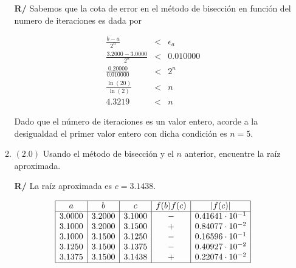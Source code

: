 \documentclass[12pt]{article}
\begin{document}
\begin{enumerate}[leftmargin=*,widest=9]
\begin{enumerate}[label=\alph*]
\textbf{R/} Sabemos que la cota de error en el método de bisección en función del numero de iteraciones es dada por 
   
   \begin{eqnarray*}
   \frac{b - a}{2^n} &<& \epsilon_a \\
   \frac{3.2000 - 3.0000}{2^n} &<& 0.010000 \\
   \frac{0.20000}{0.010000} &<& 2^n \\
   \frac{\ln(20)}{\ln(2)} &<& n \\
   4.3219 &<& n
   \end{eqnarray*}
   
   Dado que el número de iteraciones es un valor entero, acorde a la desigualdad el primer valor entero con dicha condición es \(n=5\).

   \item \((2.0)\) Usando el método de bisección y el \(n\) anterior, encuentre la raíz aproximada.

\textbf{R/} La raíz aproximada es \(c = 3.1438 \).
 
\begin{equation*}
     \begin{array}{|c|c|c|c|c|}
   \hline
   a & b & c & f(b)f(c) & |f(c)| \\
   \hline
   3.0000 & 3.2000 & 3.1000 & - & 0.41641 \cdot 10^{-1} \\
   3.1000 & 3.2000 & 3.1500 & + & 0.84077 \cdot 10^{-2} \\
   3.1000 & 3.1500 & 3.1250 & - & 0.16596 \cdot 10^{-1} \\
   3.1250 & 3.1500 & 3.1375 & - & 0.40927 \cdot 10^{-2} \\
   3.1375 & 3.1500 & 3.1438 & + & 0.22074 \cdot 10^{-2} \\
   \hline
   \end{array}
\end{equation*}   

    \end{enumerate}
    
  \end{enumerate}

\end{document}
